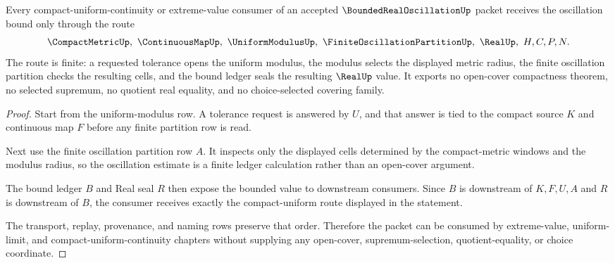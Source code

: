 \begin{theorem}
\label{thm:bounded-real-oscillation-compact-uniform-route}
Every compact-uniform-continuity or extreme-value consumer of an accepted $\BoundedRealOscillationUp$ packet receives the oscillation bound only through the route
$$
\CompactMetricUp,\ \ContinuousMapUp,\ \UniformModulusUp,\ \FiniteOscillationPartitionUp,\ \RealUp,\ H,C,P,N .
$$
The route is finite: a requested tolerance opens the uniform modulus, the modulus selects the displayed metric radius, the finite oscillation partition checks the resulting cells, and the bound ledger seals the resulting $\RealUp$ value. It exports no open-cover compactness theorem, no selected supremum, no quotient real equality, and no choice-selected covering family.
\end{theorem}
\begin{proof}
Start from the uniform-modulus row. A tolerance request is answered by $U$, and that answer is tied to the compact source $K$ and continuous map $F$ before any finite partition row is read.

Next use the finite oscillation partition row $A$. It inspects only the displayed cells determined by the compact-metric windows and the modulus radius, so the oscillation estimate is a finite ledger calculation rather than an open-cover argument.

The bound ledger $B$ and Real seal $R$ then expose the bounded value to downstream consumers. Since $B$ is downstream of $K,F,U,A$ and $R$ is downstream of $B$, the consumer receives exactly the compact-uniform route displayed in the statement.

The transport, replay, provenance, and naming rows preserve that order. Therefore the packet can be consumed by extreme-value, uniform-limit, and compact-uniform-continuity chapters without supplying any open-cover, supremum-selection, quotient-equality, or choice coordinate.
\end{proof}

